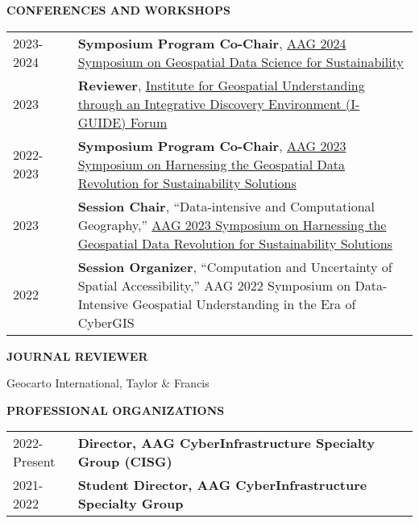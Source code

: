 \documentclass{acmcv}
\begin{document}
    \textbf{\uppercase{Conferences and Workshops}}
    \begin{longtable}{p{0.16\linewidth} p{0.84\linewidth}}
        2023-2024 & \textbf{Symposium Program Co-Chair}, \href{https://iguide.illinois.edu/aag-2024-symposium-on-geospatial-data-science-for-sustainability/}{AAG 2024 Symposium on Geospatial Data Science for Sustainability}\\
        
        2023 & \textbf{Reviewer}, \href{https://iguide.illinois.edu/forum-2023/}{Institute for Geospatial Understanding through an Integrative Discovery Environment (I-GUIDE) Forum}\\

        2022-2023 & \textbf{Symposium Program Co-Chair}, \href{https://iguide.illinois.edu/aag-2023-symposium-on-harnessing-the-geospatial-data-revolution-for-sustainability-solutions/}{AAG 2023 Symposium on Harnessing the Geospatial Data Revolution for Sustainability Solutions}\\

        2023 & \textbf{Session Chair}, ``Data-intensive and Computational Geography,'' \href{https://iguide.illinois.edu/aag-2023-symposium-on-harnessing-the-geospatial-data-revolution-for-sustainability-solutions/}{AAG 2023 Symposium on Harnessing the Geospatial Data Revolution for Sustainability Solutions}\\

        2022 & \textbf{Session Organizer}, ``Computation and Uncertainty of Spatial Accessibility,'' AAG 2022 Symposium on Data-Intensive Geospatial Understanding in the Era of CyberGIS\\
    \end{longtable}

    \textbf{\uppercase{Journal Reviewer}}
    \begin{titemize}
        \item Geocarto International, Taylor \& Francis
    \end{titemize}
    \vspace*{.25cm}
    \textbf{\uppercase{Professional Organizations}}
    \begin{longtable}{p{0.16\linewidth} p{0.84\linewidth}}

        2022-Present & \textbf{Director, AAG CyberInfrastructure Specialty Group (CISG)} \\

        2021-2022 & \textbf{Student Director, AAG CyberInfrastructure Specialty Group}
    \end{longtable}
\end{document}
